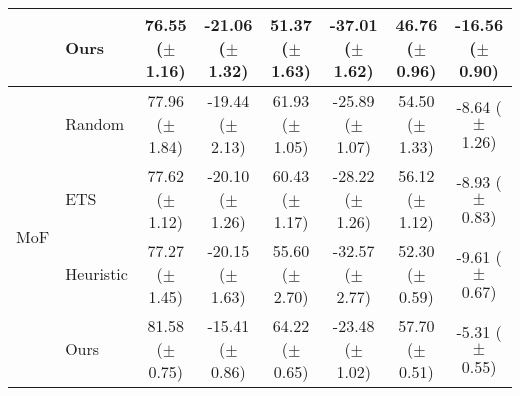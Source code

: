 \begin{table}[t]
{\begin{tabular}{l l c c c c c c}
         & Ours & 76.55 ($\pm$ 1.16) & -21.06 ($\pm$ 1.32) & 51.37 ($\pm$ 1.63) & -37.01 ($\pm$ 1.62) & 46.76 ($\pm$ 0.96) & -16.56 ($\pm$ 0.90) \\
        \midrule
        \multirow{4}{*}{MoF} & Random & 77.96 ($\pm$ 1.84) & -19.44 ($\pm$ 2.13) & 61.93 ($\pm$ 1.05) & -25.89 ($\pm$ 1.07) & 54.50 ($\pm$ 1.33) & -8.64 ($\pm$ 1.26) \\
         & ETS & 77.62 ($\pm$ 1.12) & -20.10 ($\pm$ 1.26) & 60.43 ($\pm$ 1.17) & -28.22 ($\pm$ 1.26) & 56.12 ($\pm$ 1.12) & -8.93 ($\pm$ 0.83) \\
         & Heuristic & 77.27 ($\pm$ 1.45) & -20.15 ($\pm$ 1.63) & 55.60 ($\pm$ 2.70) & -32.57 ($\pm$ 2.77) & 52.30 ($\pm$ 0.59) & -9.61 ($\pm$ 0.67) \\
         & Ours & 81.58 ($\pm$ 0.75) & -15.41 ($\pm$ 0.86) & 64.22 ($\pm$ 0.65) & -23.48 ($\pm$ 1.02) & 57.70 ($\pm$ 0.51) & -5.31 ($\pm$ 0.55) \\
        \bottomrule
    \end{tabular}
    }
    \vspace{-3mm}
    \label{tab:bwt_alternative_memory_selection}
\end{table}


